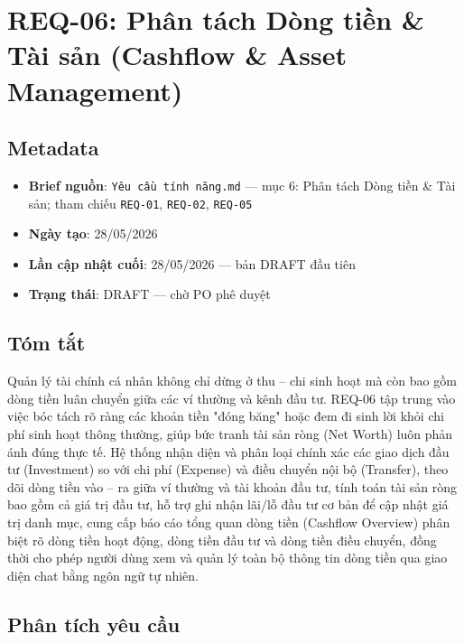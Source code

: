 \section{REQ-06: Phân tách Dòng tiền \& Tài sản (Cashflow \& Asset Management)}



\subsection{Metadata}

\begin{itemize}
\item \textbf{Brief nguồn}: \texttt{Yêu cầu tính năng.md} — mục 6: Phân tách Dòng tiền \& Tài sản; tham chiếu \texttt{REQ-01}, \texttt{REQ-02}, \texttt{REQ-05}
\item \textbf{Ngày tạo}: 28/05/2026
\item \textbf{Lần cập nhật cuối}: 28/05/2026 — bản DRAFT đầu tiên
\item \textbf{Trạng thái}: DRAFT — chờ PO phê duyệt
\end{itemize}
\subsection{Tóm tắt}

Quản lý tài chính cá nhân không chỉ dừng ở thu – chi sinh hoạt mà còn bao gồm dòng tiền luân chuyển giữa các ví thường và kênh đầu tư. REQ-06 tập trung vào việc bóc tách rõ ràng các khoản tiền "đóng băng" hoặc đem đi sinh lời khỏi chi phí sinh hoạt thông thường, giúp bức tranh tài sản ròng (Net Worth) luôn phản ánh đúng thực tế. Hệ thống nhận diện và phân loại chính xác các giao dịch đầu tư (Investment) so với chi phí (Expense) và điều chuyển nội bộ (Transfer), theo dõi dòng tiền vào – ra giữa ví thường và tài khoản đầu tư, tính toán tài sản ròng bao gồm cả giá trị đầu tư, hỗ trợ ghi nhận lãi/lỗ đầu tư cơ bản để cập nhật giá trị danh mục, cung cấp báo cáo tổng quan dòng tiền (Cashflow Overview) phân biệt rõ dòng tiền hoạt động, dòng tiền đầu tư và dòng tiền điều chuyển, đồng thời cho phép người dùng xem và quản lý toàn bộ thông tin dòng tiền qua giao diện chat bằng ngôn ngữ tự nhiên.



\subsection{Phân tích yêu cầu}



